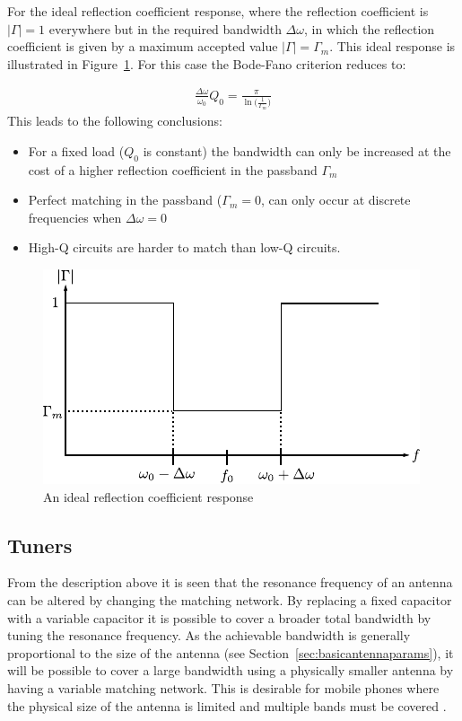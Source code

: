 For the ideal reflection coefficient response, where the reflection coefficient is $|\Gamma|=1$ everywhere but in the required bandwidth $\Delta \omega$, in which the reflection coefficient is given by a maximum accepted value $|\Gamma|=\Gamma_{m}$. This ideal response is illustrated in Figure~\ref{fig:idealReflec}. For this case the Bode-Fano criterion reduces to\cite{AntennaswithNonFosterMatchingNetworks}:

\begin{align}
  \frac{\Delta \omega}{\omega_0} Q_0 = \frac{\pi}{\ln \big(\frac{1}{\Gamma_m} \big)}
\end{align}
This leads to the following conclusions\cite{pozar2011microwave}:
\begin{itemize}
\item For a fixed load ($Q_0$ is constant) the bandwidth can only be increased at the cost of a higher reflection coefficient in the passband $\Gamma_m$
\item Perfect matching in the passband ($\Gamma_m = 0$, can only occur at discrete frequencies when $\Delta \omega = 0$
\item High-Q circuits are harder to match than low-Q circuits.  
\end{itemize}

\begin{figure}[htbp]
    \centering
    \includegraphics{img/analysis/ideal_reflecResponse}
    \caption{An ideal reflection coefficient response\cite{AntennaswithNonFosterMatchingNetworks}}
    \label{fig:idealReflec}
\end{figure}


\subsection{Tuners}
From the description above it is seen that the resonance frequency of an antenna can be altered by changing the matching network. By replacing a fixed capacitor with a variable capacitor it is possible to cover a broader total bandwidth by tuning the resonance frequency. As the achievable bandwidth is generally proportional to the size of the antenna (see Section~\ref{sec:basicantennaparams}), it will be possible to cover a large bandwidth using a physically smaller antenna by having a variable matching network. This is desirable for mobile phones where the physical size of the antenna is limited and multiple bands must be covered \cite{gu2014rf}.

